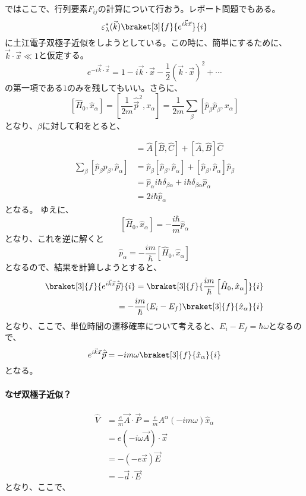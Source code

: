 \documentclass[titlepage]{ltjsarticle}
\newcommand{\mel}[3]{\braket[3]{#1}{#2}{#3}}
\begin{document}
ではここで、行列要素\(F_{ij}\)の計算について行おう。レポート問題でもある。
\begin{equation}
  \varepsilon^*_\lambda(\vec{k}) \mel{f}{e^{i \vec{k}\vec{x}}}{i}
\end{equation}
に土江電子双極子近似をしようとしている。この時に、簡単にするために、\(\vec{k}\cdot \vec{x}\ll 1\)と仮定する。
\begin{equation}
  e^{-i \vec{k}\cdot \vec{x}} = 1 - i \vec{k}\cdot \vec{x} - \frac{1}{2}(\vec{k}\cdot \vec{x})^2 + \cdots
\end{equation}
の第一項である\(1\)のみを残してもいい。さらに、
\begin{equation}
  \left[ \hat{H}_0, \hat{x}_\alpha \right]  = \left[ \frac{1}{2m} \hat{\vec{p}}^2 , x_\alpha  \right] = \frac{1}{2m}\sum_\beta \left[ \hat{p}_\beta \hat{p}_\beta, x_\alpha \right] 
\end{equation}
となり、\(\beta\)に対して和をとると、

\begin{align}
  [\hat{A}\hat{B},\hat{C}] & = \hat{A} \left[ \hat{B} , \hat{C} \right] + \left[ \hat{A} , \hat{B} \right] \hat{C} \\
  \sum_\beta [\hat{p}_\beta \hat{p}_\beta , \hat{p}_\alpha] & = \hat{p}_\beta [\hat{p}_\beta , \hat{p}_\alpha] + [\hat{p}_\beta , \hat{p}_\alpha] \hat{p}_\beta \\
  & = \hat{p}_\alpha i \hbar \delta_{\beta \alpha} + i \hbar \delta_{\beta \alpha} \hat{p}_\alpha \\
  & = 2i \hbar \hat{p}_\alpha
\end{align}
となる。
ゆえに、
\begin{equation}
  \left[ \hat{H}_0,\hat{x}_\alpha \right] = - \frac{i \hbar}{m} \hat{p}_\alpha
\end{equation}
となり、これを逆に解くと
\begin{equation}
  \hat{p}_\alpha = -\frac{i m}{\hbar} \left[ \hat{H}_0 , \hat{x}_\alpha \right]
\end{equation}
となるので、結果を計算しようとすると、
\begin{align}
  \mel{f}{e^{i \vec{k}\vec{x}}\hat{\vec{p}}}{i} = \mel{f}{ \frac{i m}{\hbar} \left[ \hat{H}_0,\hat{x}_\alpha \right]}{i} \\
  = -\frac{im}{\hbar}(E_i-E_f) \mel{f}{\hat{x}_\alpha}{i}
\end{align}
となり、ここで、単位時間の遷移確率について考えると、\(E_i-E_f = \hbar \omega\)となるので、
\begin{equation}
  e^{i \vec{k}\vec{x}}\hat{\vec{p}} = -im\omega \mel{f}{\hat{x}_\alpha}{i}
\end{equation}
となる。

\paragraph{なぜ双極子近似？}
\begin{align}
  \hat{V}& = \frac{e}{m} \vec{A} \cdot \vec{P} = \frac{e}{m} A^\alpha (-im\omega) \hat{x}_\alpha \\
  & = e(-i\omega \vec{A})\cdot \vec{x}\\
  & = -(-e \vec{x}) \vec{E} \\
  & = - \vec{d} \cdot \vec{E}
\end{align}
となり、ここで、
\end{document}
